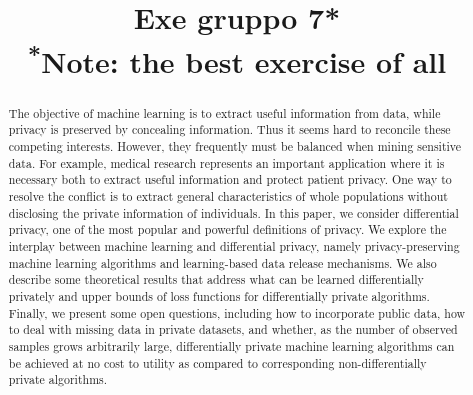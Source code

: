 \documentclass[conference]{IEEEtran}
\begin{document}
\title{Exe gruppo 7*\\
{\footnotesize \textsuperscript{*}Note: the best exercise of all}
}

\author{
\and
{}
\and
{}
\and
{}
}

\maketitle

\begin{abstract}
The objective of machine learning is to extract useful information from data, while privacy is preserved by concealing information. Thus it seems hard to reconcile these competing interests. However, they frequently must be balanced when mining sensitive data. For example, medical research represents an important application where it is necessary both to extract useful information and protect patient privacy. One way to resolve the conflict is to extract general characteristics of whole populations without disclosing the private information of individuals.
In this paper, we consider differential privacy, one of the most popular and powerful definitions of privacy. We explore the interplay between machine learning and differential privacy, namely privacy-preserving machine learning algorithms and learning-based data release mechanisms. We also describe some theoretical results that address what can be learned differentially privately and upper bounds of loss functions for differentially private algorithms.
Finally, we present some open questions, including how to incorporate public data, how to deal with missing data in private datasets, and whether, as the number of observed samples grows arbitrarily large, differentially private machine learning algorithms can be achieved at no cost to utility as compared to corresponding non-differentially private algorithms.
\end{abstract}
\end{document}
